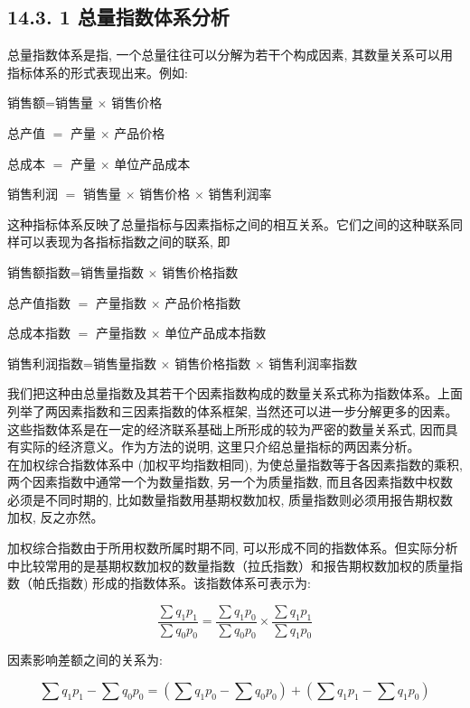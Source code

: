\documentclass[10pt]{article}
\begin{document}
\begin{CJK*}{UTF8}{bsmi}
\subsection*{14.3. 1 总量指数体系分析}
总量指数体系是指, 一个总量往往可以分解为若干个构成因素, 其数量关系可以用指标体系的形式表现出来。例如:

销售额=销售量 $\times$ 销售价格

总产值 $=$ 产量 $\times$ 产品价格

总成本 $=$ 产量 $\times$ 单位产品成本

销售利润 $=$ 销售量 $\times$ 销售价格 $\times$ 销售利润率

这种指标体系反映了总量指标与因素指标之间的相互关系。它们之间的这种联系同样可以表现为各指标指数之间的联系, 即

销售额指数=销售量指数 $\times$ 销售价格指数

总产值指数 $=$ 产量指数 $\times$ 产品价格指数

总成本指数 $=$ 产量指数 $\times$ 单位产品成本指数

销售利润指数=销售量指数 $\times$ 销售价格指数 $\times$ 销售利润率指数

我们把这种由总量指数及其若干个因素指数构成的数量关系式称为指数体系。上面列举了两因素指数和三因素指数的体系框架, 当然还可以进一步分解更多的因素。这些指数体系是在一定的经济联系基础上所形成的较为严密的数量关系式, 因而具有实际的经济意义。作为方法的说明, 这里只介绍总量指标的两因素分析。\\
在加权综合指数体系中 (加权平均指数相同), 为使总量指数等于各因素指数的乘积,两个因素指数中通常一个为数量指数, 另一个为质量指数, 而且各因素指数中权数必须是不同时期的, 比如数量指数用基期权数加权, 质量指数则必须用报告期权数加权, 反之亦然。

加权综合指数由于所用权数所属时期不同, 可以形成不同的指数体系。但实际分析中比较常用的是基期权数加权的数量指数（拉氏指数）和报告期权数加权的质量指数（帕氏指数) 形成的指数体系。该指数体系可表示为:


\begin{equation*}
\frac{\sum q_{1} p_{1}}{\sum q_{0} p_{0}}=\frac{\sum q_{1} p_{0}}{\sum q_{0} p_{0}} \times \frac{\sum q_{1} p_{1}}{\sum q_{1} p_{0}} \tag{14.14}
\end{equation*}


因素影响差额之间的关系为:


\begin{equation*}
\sum q_{1} p_{1}-\sum q_{0} p_{0}=\left(\sum q_{1} p_{0}-\sum q_{0} p_{0}\right)+\left(\sum q_{1} p_{1}-\sum q_{1} p_{0}\right) \tag{14.15}
\end{equation*}



\end{CJK*}
\end{document}
